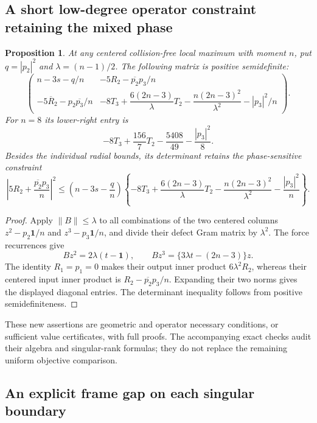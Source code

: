 \documentclass[11pt]{article}
\newtheorem{proposition}[theorem]{Proposition}
\theoremstyle{remark}
\numberwithin{equation}{section}
\begin{document}
\subsection{A short low-degree operator constraint retaining the mixed phase}

\begin{proposition}\label{prop:noorigin-oct8-low-operator-gram}
At any centered collision-free local maximum with moment $n$, put
$q=|p_2|^2$ and $\lambda=(n-1)/2$. The following matrix is positive
semidefinite:
\[
 \begin{pmatrix}
 n-3s-q/n&-5R_2-\overline{p_2}p_3/n\\
 -5\overline R_2-p_2\overline{p_3}/n&
 -8T_3+\dfrac{6(2n-3)}\lambda T_2
       -\dfrac{n(2n-3)^2}{\lambda^2}-|p_3|^2/n
 \end{pmatrix}.
\]
For $n=8$ its lower-right entry is
\[
 -8T_3+\frac{156}{7}T_2-\frac{5408}{49}-\frac{|p_3|^2}{8}.
\]
Besides the individual radial bounds, its determinant retains the
phase-sensitive constraint
\[
 \left|5R_2+\frac{\overline{p_2}p_3}{n}\right|^2
 \le\left(n-3s-\frac qn\right)
 \left\{-8T_3+\frac{6(2n-3)}\lambda T_2
       -\frac{n(2n-3)^2}{\lambda^2}-\frac{|p_3|^2}{n}\right\}.
\]
\end{proposition}
\begin{proof}
Apply $\|B\|\le\lambda$ to all combinations of the two centered
columns $z^2-p_2\mathbf1/n$ and $z^3-p_3\mathbf1/n$, and divide
their defect Gram matrix by $\lambda^2$. The force recurrences give
\[
 Bz^2=2\lambda(t-\mathbf1),\qquad
 Bz^3=\{3\lambda t-(2n-3)\}z.
\]
The identity $R_1=p_1=0$ makes their output inner product
$6\lambda^2R_2$, whereas their centered input inner product is
$R_2-\overline{p_2}p_3/n$. Expanding their two norms gives the
displayed diagonal entries. The determinant inequality follows
from positive semidefiniteness.
\end{proof}

These new assertions are geometric and operator necessary conditions,
or sufficient value certificates, with full proofs. The accompanying
exact checks audit their algebra and singular-rank formulas; they do
not replace the remaining uniform objective comparison.

\subsection{An explicit frame gap on each singular boundary}
\end{document}

